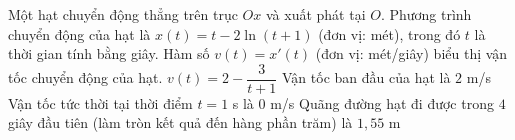 \begin{ex}%
	Một hạt chuyển động thẳng trên trục $Ox$ và xuất phát tại $O$. Phương trình chuyển động của hạt là $x(t)=t-2\ln (t+1)$ (đơn vị: mét), trong đó $t$ là thời gian tính bằng giây. Hàm số $v(t)=x'(t)$ (đơn vị: mét/giây) biểu thị vận tốc chuyển động của hạt.
	\choiceTF
	{$v(t)=2-\dfrac{3}{t+1}$}
	{Vận tốc ban đầu của hạt là $2$ m/s}
	{\True Vận tốc tức thời tại thời điểm $t=1$ s là $0$ m/s}
	{\True Quãng đường hạt đi được trong $4$ giây đầu tiên (làm tròn kết quả đến hàng phần trăm) là $1,55$ m}
\end{ex}
